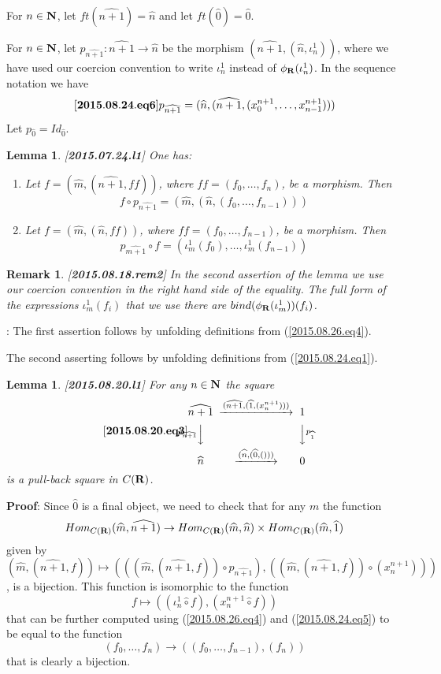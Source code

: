 \documentclass[11pt]{article}
\newenvironment{eq}{\begin{equation}}{\end{equation}}
\newenvironment{proof}{{\bf Proof}:}{\vskip 5mm }
\newtheorem{lemma}[proposition]{Lemma}
\newtheorem{remark}[proposition]{Remark}
\newcommand{\llabel}[1]{\label{#1}[{\bf #1}]}
\newcommand{\sr}{\rightarrow}
\newcommand{\nn}{{\bf N\rm}}
\newcommand{\nat}{\nn}
\newcommand{\rr}{{\bf R}}
\newcommand{\wh}{\widehat}
\newcommand{\bind}{bind}
\newcommand{\hc}{\wh{\circ}}
\begin{document}
For $n\in\nat$, let $ft(\wh{n+1})=\wh{n}$ and let $ft(\wh{0})=\wh{0}$.

For $n\in\nat$, let $p_{\wh{n+1}}:\wh{n+1}\sr \wh{n}$ be the morphism $(\wh{n+1},(\wh{n},\iota_n^1))$,
where we have used our coercion convention to write $\iota_n^1$ instead of $\phi_{\rr}(\iota_n^1)$. In the sequence notation we have
%
\begin{eq}\llabel{2015.08.24.eq6}
p_{\wh{n+1}}=(\wh{n},(\wh{n+1},(x_0^{n+1},\dots,x_{n-1}^{n+1})))
\end{eq}
%
Let  $p_{\wh{0}}=Id_{\wh{0}}$.
%
\begin{lemma}
\llabel{2015.07.24.l1}
One has:
%
\begin{enumerate}
\item Let $f=(\wh{m},(\wh{n+1},ff))$, where $ff=(f_0,\dots,f_n)$, be a morphism. Then 
%
$$f\circ p_{\wh{n+1}}=(\wh{m},(\wh{n},(f_0,\dots,f_{n-1})))$$
%
\item Let $f=(\wh{m},(\wh{n},ff))$, where $ff=(f_0,\dots,f_{n-1})$, be a morphism. Then 
%
$$p_{\wh{m+1}}\circ f=(\iota_m^1(f_0),\dots,\iota_m^1(f_{n-1}))$$
%
\end{enumerate}
\end{lemma}
%
\begin{remark}\rm
\llabel{2015.08.18.rem2}
In the second assertion of the lemma we use our coercion convention in the right hand side of the equality. The full form of the expressions $\iota_m^1(f_i)$ that we use there are $\bind(\phi_{\rr}(\iota_m^1))(f_i)$.
\end{remark}
%
\begin{proof}
The first assertion follows by unfolding definitions from (\ref{2015.08.26.eq4}). 

The second asserting follows by unfolding definitions from (\ref{2015.08.24.eq1}). 
\end{proof}
%
\begin{lemma}
\llabel{2015.08.20.l1}
For any $n\in\nat$ the square
%
\begin{eq}\llabel{2015.08.20.eq3}
\begin{CD}
\wh{n+1} @>(\wh{n+1},(\wh{1},(x_n^{n+1})))>> 1\\
@Vp_{\wh{n+1}}VV @VVp_{\wh{1}}V\\
\wh{n} @>(\wh{n},(\wh{0},()))>> 0
\end{CD}
\end{eq}
%
is a pull-back square in $C(\rr)$.
\end{lemma}
%
\begin{proof}
Since $\wh{0}$ is a final object, we need to check that for any $m$ the function
%
$$Hom_{C(\rr)}(\wh{m},\wh{n+1})\sr Hom_{C(\rr)}(\wh{m},\wh{n})\times Hom_{C(\rr)}(\wh{m},\wh{1})$$
%
given by $(\wh{m},(\wh{n+1},f))\mapsto (((\wh{m},(\wh{n+1},f))\circ p_{\wh{n+1}}),((\wh{m},(\wh{n+1},f))\circ (x_n^{n+1})))$, is a bijection. This function is isomorphic to the function
%
$$f\mapsto ((\iota_n^1\hc f),(x_n^{n+1}\hc f))$$
%
that can be further computed using (\ref{2015.08.26.eq4}) and (\ref{2015.08.24.eq5}) to be equal to the function 
%
$$(f_0,\dots,f_{n})\sr ((f_0,\dots,f_{n-1}), (f_n))$$
%
that is clearly a bijection. 
\end{proof}
\end{document}

